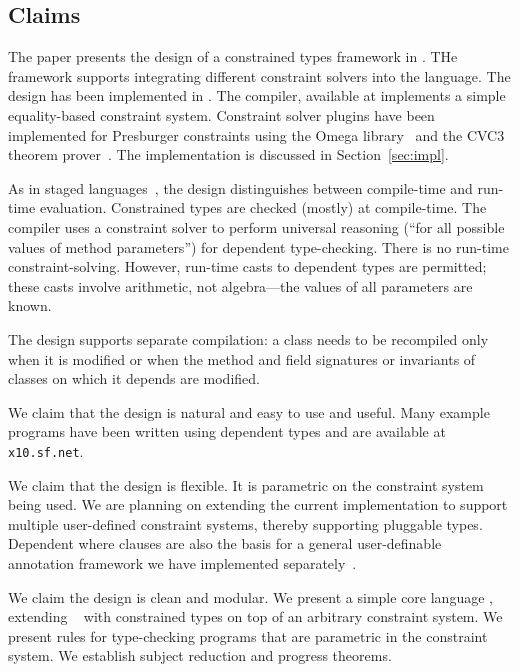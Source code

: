 \subsection{Claims}

The paper presents the design of a constrained types framework
in \Xten{}.
THe framework supports
integrating
different constraint solvers into the language.
The design has been implemented
in \Xten{}.  The \Xten{} compiler, available at 
implements a simple
equality-based constraint system.  Constraint solver plugins
have been implemented for Presburger constraints using the Omega
library~\cite{omega} and the CVC3 theorem prover~\cite{cvc}.
The implementation is
discussed in Section~\ref{sec:impl}.

As in staged languages~\cite{nielson-multistage,ts97-multistage}, the
design distinguishes between compile-time and run-time
evaluation. Constrained types are checked (mostly) at compile-time.
The compiler uses a constraint solver to perform universal reasoning
(``for all possible values of method parameters'') for dependent
type-checking.  There is no run-time constraint-solving.  However,
run-time casts to dependent types are permitted; these casts involve
arithmetic, not algebra---the values of all parameters are known.

The design supports separate compilation: a class needs to be
recompiled only when it is modified or when the method
and field signatures or invariants of classes on which it
depends are modified.

We claim that the design is natural and easy to use and useful. Many
example programs have been written using dependent types and are
available at {\tt x10.sf.net}.

We claim that the design is flexible. It is parametric on the
constraint system being used. We are planning on extending the current
implementation to support multiple user-defined constraint systems,
thereby supporting pluggable types. Dependent where clauses are also
the basis for a general user-definable annotation framework we have
implemented separately~\cite{ns07-x10anno}. 

We claim the design is clean and modular. We present a simple core
language \CFJ, extending \FJ{}~\cite{FJ} with constrained types on top
of an arbitrary constraint system. We present rules for type-checking
\CFJ{} programs that are parametric in the constraint system. 
We establish subject reduction and progress theorems. 

%

